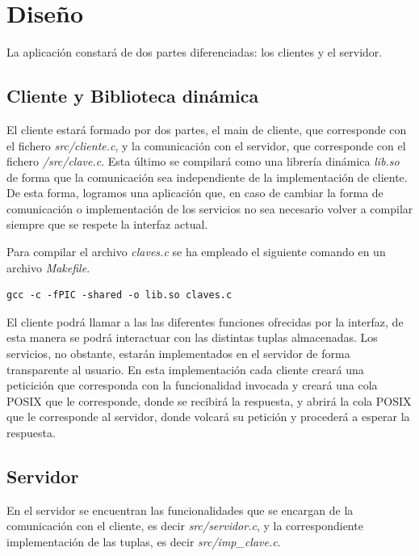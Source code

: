 \documentclass[]{article}
\begin{document}
\section{Diseño}
\label{sec:disenno}
La aplicación constará de dos partes diferenciadas: los clientes y el servidor.

\subsection{Cliente y Biblioteca dinámica}
\label{subsec:cliente_biblioteca}
El cliente estará formado por dos partes, el main de cliente, que corresponde con el fichero \textit{src/cliente.c}, y la comunicación con el servidor, que corresponde con el fichero \textit{/src/clave.c}. Esta último se compilará como una librería dinámica \textit{lib.so} de forma que la comunicación sea independiente de la implementación de cliente. De esta forma, logramos una aplicación que, en caso de cambiar la forma de comunicación o implementación de los servicios no sea necesario volver a compilar siempre que se respete la interfaz actual. 

Para compilar el archivo \textit{claves.c} se ha empleado el siguiente comando en un archivo \textit{Makefile}.

\begin{center}
\begin{lstlisting}[caption=Compiación de biblioteca dinámica]
gcc -c -fPIC -shared -o lib.so claves.c
\end{lstlisting}
\end{center}

El  cliente podrá llamar a las  las diferentes funciones ofrecidas por la interfaz, de esta manera se podrá interactuar con las distintas tuplas almacenadas. Los servicios, no obstante, estarán implementados en el servidor de forma transparente al usuario.
En esta implementación cada cliente creará una peticición que corresponda con la funcionalidad invocada y creará una cola POSIX que le corresponde, donde se recibirá la respuesta, y abrirá la cola POSIX que le corresponde al servidor, donde volcará su petición y procederá a esperar la respuesta.

\subsection{Servidor}
\label{subsec:servidor}
En el servidor se encuentran las funcionalidades que se encargan de la comunicación con el cliente, es decir \textit{src/servidor.c}, y la correspondiente implementación de las tuplas, es decir \textit{src/imp\_clave.c}.
\end{document}
